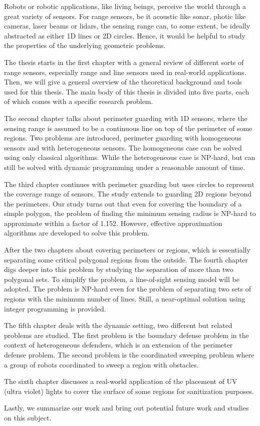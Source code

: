 \begin{my_abstract}

Robots or robotic applications, like living beings, perceive the world through
a great variety of sensors.
For range sensors, be it acoustic like sonar, photic like cameras, laser beams or lidars, 
the sensing range can, to some extent, be ideally abstracted as either 1D lines or 2D circles.
Hence, it would be helpful to study the properties of the underlying geometric problems.

The thesis starts in the first chapter with a general review of different sorts of range sensors, 
especially range and line sensors used in real-world applications. 
Then, we will give a general overview of the theoretical background and tools used for this thesis. 
The main body of this thesis is divided into five parts, each of which comes with 
a specific research problem. 

The second chapter talks about perimeter guarding with 1D sensors, where the sensing range 
is assumed to be a continuous line on top of the perimeter of some regions. Two problems are 
introduced, perimeter guarding with homogeneous sensors and with heterogeneous sensors. 
The homogeneous case can be solved using only classical algorithms. 
While the heterogeneous case is NP-hard, but can still be solved with dynamic programming under a reasonable
amount of time. 

The third chapter continues with perimeter guarding but uses circles to represent the 
coverage range of sensors. The study extends to guarding 2D regions beyond the perimeters. 
Our study turns out that even for covering the boundary of a simple polygon, 
the problem of finding the minimum sensing radius is NP-hard to approximate within a factor of 1.152. 
However, effective approximation algorithms are developed to solve this problem. 

After the two chapters about covering perimeters or regions, which is essentially separating 
some critical polygonal regions from the outside. 
The fourth chapter digs deeper into this problem by studying the separation of more than two polygonal sets. 
To simplify the problem, a line-of-sight sensing model will be adopted. 
The problem is NP-hard even for the problem of separating two sets of regions with the minimum number of lines.
Still, a near-optimal solution using integer programming is provided.

The fifth chapter deals with the dynamic setting, two different but related problems are studied. 
The first problem is the boundary defense problem in the context of heterogeneous defenders,
which is an extension of the perimeter defense problem. 
The second problem is the coordinated sweeping problem where a group of robots coordinated to sweep a region with obstacles. 

The sixth chapter discusses a real-world application of the placement of UV (ultra violet) lights
to cover the surface of some regions for sanitization purposes. 

Lastly, we summarize our work and bring out potential future work and studies on this subject.

\end{my_abstract}
